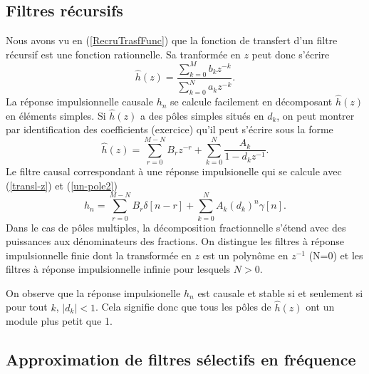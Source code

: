 \subsection{Filtres r\'ecursifs}
Nous avons vu en (\ref{RecruTrasfFunc}) que la fonction de
transfert d'un filtre r\'ecursif
est une fonction rationnelle. Sa tranform\'ee en $z$ peut
donc s'\'ecrire
\[
\hat h(z) =
\frac {\sum_{k=0}^M b_k z^{-k}} {\sum_{k=0}^N a_k z^{-k} }.
\]
La r\'eponse impulsionnelle causale $h_n$ se calcule
facilement en d\'ecomposant $\hat h (z)$ en \'el\'ements simples.
Si $\hat h (z)$ a des p\^oles simples situ\'es
en $d_k$, on peut montrer par identification des coefficients
(exercice) qu'il peut s'\'ecrire sous la forme
\[
\hat h (z) = \sum_{r=0}^{M-N} B_r z^{-r} +
\sum_{k=0}^{N} \frac {A_k} {1 - d_k z^{-1}} .
\]
Le filtre causal correspondant \`a une r\'eponse impulsionelle
qui se calcule avec (\ref{transl-z}) et (\ref{un-pole2})
\[
h_n =
\sum_{r=0}^{M-N} B_r \delta[n-r] +
\sum_{k=0}^{N} {A_k} (d_k)^n \gamma[n] .
\]
Dans le cas de p\^oles multiples, la d\'ecomposition fractionnelle
s'\'etend avec des puissances aux d\'enominateurs des fractions.
On distingue les filtres \`a r\'eponse impulsionnelle finie
dont la transform\'ee en $z$ est un polyn\^{o}me en $z^{-1}$ (N=0)
et les filtres \`a r\'eponse impulsionnelle infinie pour lesquels
$N > 0$.

On observe que la r\'eponse impulsionelle $h_n$ est
causale et stable si et seulement si pour tout $k$, $|d_k| < 1$.
Cela signifie donc que tous les p\^oles de $\hat h (z)$ ont
un module plus petit que 1.

\subsection{Approximation de filtres s\'electifs en fr\'equence}

